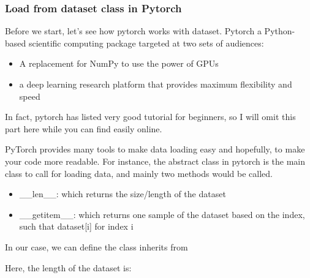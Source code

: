 \documentclass[letterpaper,10pt,english]{sphinxmanual}
\begin{document}
\subsubsection{Load from dataset class in Pytorch}
\label{\detokenize{usage/data:load-from-dataset-class-in-pytorch}}
Before we start, let’s see how pytorch works with dataset. Pytorch a Python-based scientific computing package targeted at two sets of audiences:
\begin{itemize}
\item {} 
A replacement for NumPy to use the power of GPUs

\item {} 
a deep learning research platform that provides maximum flexibility and speed

\end{itemize}

In fact, pytorch has listed very good tutorial for beginners, so I will omit this part here while you can find easily online.


PyTorch provides many tools to make data loading easy and hopefully, to make your code more readable. For instance, the abstract class in pytorch  is the main class to call for loading data, and mainly two methods would be called.
\begin{itemize}
\item {} 
\_\_len\_\_: which returns the size/length of the dataset

\item {} 
\_\_getitem\_\_: which returns one sample of the dataset based on the index, such that dataset{[}i{]} for index i

\end{itemize}

In our case, we can define the class  inherits from 

Here, the length of the dataset is:

%
\begin{sphinxVerbatim}[commandchars=\\\{\}]
 

     
\end{sphinxVerbatim}
\end{document}
